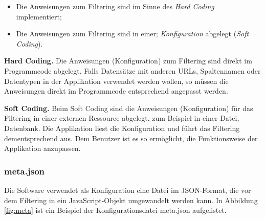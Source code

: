 \begin{itemize}
	\item Die Anweisungen zum Filtering sind im Sinne des \textit{Hard Coding} implementiert;
	\item Die Anweisungen zum Filtering sind in einer; \textit{Konfiguration} abgelegt (\textit{Soft Coding}).
\end{itemize}

\textbf{Hard Coding.} Die Anweisungen (Konfiguration) zum Filtering sind direkt im Programmcode abgelegt. Falls Datensätze mit anderen URLs, Spaltennamen oder Datentypen in der Applikation verwendet werden wollen, so müssen die Anweisungen direkt im Programmcode entsprechend angepasst werden.

\textbf{Soft Coding.} Beim Soft Coding sind die Anweisungen (Konfiguration) für das Filtering in einer externen Ressource abgelegt, zum Beispiel in einer Datei, Datenbank. Die Applikation liest die Konfiguration und führt das Filtering dementsprechend aus. Dem Benutzer ist es so ermöglicht, die Funktionsweise der Applikation anzupassen.

\subsubsection{meta.json}

Die Software verwendet als Konfiguration eine Datei im JSON-Format, die vor dem Filtering in ein JavaScript-Objekt umgewandelt werden kann. In Abbildung \ref{fig:meta} ist ein Beispiel der Konfigurationsdatei meta.json aufgelistet.

